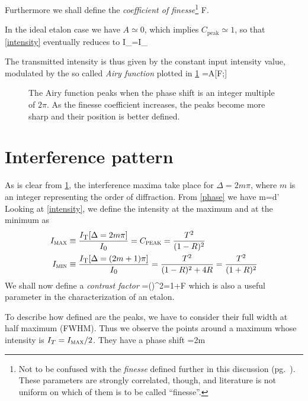 Furthermore we shall define the \textit{coefficient of finesse}\footnote{Not to be confused with the \textit{finesse} defined further in this discussion (pg.~\pageref{finesse}). These parameters are strongly correlated, though, and literature is not uniform on which of them is to be called \textquotedblleft finesse\textquotedblright.}
\mate
F\equiv{}.
\atem

In the ideal etalon case we have $A\simeq0$, which implies $C_{\mbox{peak}}\simeq1$,  so that \cref{intensity} eventually reduces to
\mate
I_{}=I_{}\ 
\atem

The transmitted intensity is thus given by the constant input intensity value, modulated by the so called \textit{Airy function} plotted in \cref{Airyplot}
\mate
{}=\equiv A[F;\Delta]
\atem

\begin{figure}[!htb]\centering

\caption{The Airy function peaks when the phase shift is an integer multiple of $2\pi$. As the finesse coefficient increases, the peaks become more sharp and their position is better defined.}
\label{Airyplot}
\end{figure}
	\section{Interference pattern}\label{interferencepattern}
As is clear from \cref{Airyplot}, the interference maxima take place for $\Delta=2m\pi$, where $m$ is an integer representing the order of diffraction.
From \cref{phase} we have
\mate
m=d\cos\theta'
\label{ordine}
\atem
Looking at \cref{intensity}, we define the intensity at the maximum and at the minimum as
\begin{align}
I_{\mbox{\footnotesize{\scshape{max}}}}&\equiv\frac{I_{\mbox{\footnotesize{\scshape{T}}}}[\Delta=2m\pi]}{I_{\mbox{\footnotesize{\scshape{0}}}}}=C_{\mbox{\footnotesize{\scshape{peak}}}}=\frac{T^2}{(1-R)^2}\\
I_{\mbox{\footnotesize{\scshape{min}}}}&\equiv\frac{I_{\mbox{\footnotesize{\scshape{T}}}}[\Delta=(2m+1)\pi]}{I_{\mbox{\footnotesize{\scshape{0}}}}}=\frac{T^2}{(1-R)^2+4R}=\frac{T^2}{(1+R)^2}
\end{align}
We shall now define a \textit{contrast factor}
\mate
{}\equiv{}=\left(\right)^2=1+F
\atem
which is also a useful parameter in the characterization of an etalon.

To describe how defined are the peaks, we have to consider their full width at half maximum (FWHM). Thus we observe the points around a maximum whose intensity is $I_{T}=I_{\mbox{\footnotesize{\scshape{max}}}}/2$. They have a phase shift 
\mate
\Delta=2m\pi\pm{}
\atem

